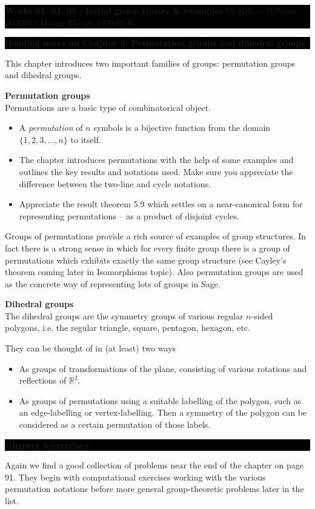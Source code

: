 \documentclass[oneside,10pt]{amsart}
\newcommand{\cbox}[1]{\colorbox{black}{\begin{minipage}{\linewidth}\color{white}\sffamily #1 \end{minipage}}}
\newcommand{\tuttitle}[4]{\cbox{\textbf{#1} \hfill {#2}\\{#3} \hfill {\Small #4}}\vskip 4pt}
\newcommand{\topic}[1]{\cbox{\textbf{#1}}\vskip 4pt}
\begin{document}
\tuttitle{Weeks 03, 04, 05 $|$ Initial group theory \& examples}{Dr Killian O'Brien}{6GZ3012 Group Theory}{\today}
\vskip 16pt

\topic{Reading notes on Chapter 5: Permutation groups and dihedral groups}
This chapter introduces two important families of groups: permutation groups and dihedral groups.

\textbf{Permutation groups}\\
Permutations are a basic type of combinatorical object.
\begin{itemize}
\item
A \emph{permutation} of $n$ symbols is a bijective function from the domain $\{ 1, 2, 3, \dots , n\}$ to itself.
\item
The chapter introduces permutations with the help of some examples and outlines the key results and notations used. Make sure you appreciate the difference between the two-line and cycle notations.
\item
Appreciate the result theorem 5.9 which settles on a near-canonical form for representing permutations -- as a product of disjoint cycles.
\end{itemize}

Groups of permutations provide a rich source of examples of group structures. In fact there is a strong sense in which for every finite group there is a group of permutations which exhibits exactly the same group structure (see Cayley's theorem coming later in Isomorphisms topic). Also permutation groups are used as the concrete way of representing lots of groups in Sage.

\textbf{Dihedral groups}\\
The dihedral groups are the symmetry groups of various regular $n$-sided polygons, i.e. the regular triangle, square, pentagon, hexagon, etc.

They can be thought of in (at least) two ways
\begin{itemize}
\item
As groups of transformations of the plane, consisting of various rotations and reflections of $\mathbb{R}^2$.
\item
As groups of permutations using a suitable labelling of the polygon, such as an edge-labelling or vertex-labelling. Then a symmetry of the polygon can be considered as a certain permutation of those labels.
\end{itemize}


\vskip 4pt

\topic{Chapter 5 exercises}
Again we find a good collection of problems near the end of the chapter on page 91. They begin with computational exercises working with the various permutation notations before more general group-theoretic problems later in the list.
\end{document}
